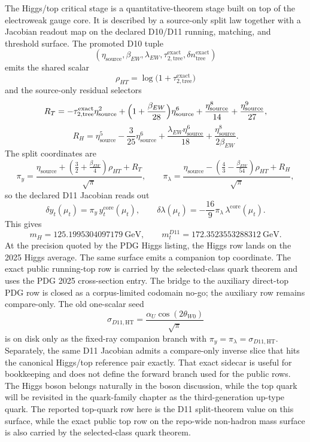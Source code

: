 \documentclass[11pt]{article}
\begin{document}
The Higgs/top critical stage is a quantitative-theorem stage built on top of the electroweak gauge core.
It is described by a source-only split law together with a Jacobian readout map on the declared D10/D11 running, matching, and threshold surface. The promoted D10 tuple
\[
(\eta_{\mathrm{source}},\beta_{EW},\lambda_{EW},\tau_{2,\mathrm{tree}}^{\mathrm{exact}},\delta n_{\mathrm{tree}}^{\mathrm{exact}})
\]
emits the shared scalar
\[
\rho_{HT}=\log\!\bigl(1+\tau_{2,\mathrm{tree}}^{\mathrm{exact}}\bigr)
\]
and the source-only residual selectors
\[
R_T=
-\tau_{2,\mathrm{tree}}^{\mathrm{exact}}\eta_{\mathrm{source}}^2
+\Bigl(1+\frac{\beta_{EW}}{28}\Bigr)\eta_{\mathrm{source}}^6
+\frac{\eta_{\mathrm{source}}^8}{14}
+\frac{\eta_{\mathrm{source}}^9}{27},
\]
\[
R_H=
\eta_{\mathrm{source}}^5
-\frac{3}{25}\eta_{\mathrm{source}}^6
+\frac{\lambda_{EW}\eta_{\mathrm{source}}^6}{18}
+\frac{\eta_{\mathrm{source}}^8}{2\beta_{EW}}.
\]
The split coordinates are
\[
\pi_y=
\frac{\eta_{\mathrm{source}}+\left(\frac32+\frac{\beta_{EW}}4\right)\rho_{HT}+R_T}{\sqrt{\pi}},
\qquad
\pi_\lambda=
\frac{\eta_{\mathrm{source}}-\left(\frac43-\frac{\beta_{EW}}{54}\right)\rho_{HT}+R_H}{\sqrt{\pi}},
\]
so the declared D11 Jacobian reads out
\[
\delta y_t(\mu_t)=\pi_y\,y_t^{\mathrm{core}}(\mu_t),
\qquad
\delta\lambda(\mu_t)=-\frac{16}{9}\pi_\lambda\,\lambda^{\mathrm{core}}(\mu_t).
\]
This gives
\[
m_H = 125.1995304097179~\mathrm{GeV},
\qquad
m_t^{D11} = 172.3523553288312~\mathrm{GeV}.
\]
At the precision quoted by the PDG Higgs listing, the Higgs row lands on the 2025 Higgs average. The
same surface emits a companion top coordinate. The exact public running-top row is carried by the
selected-class quark theorem and uses the PDG 2025 cross-section entry. The bridge to the auxiliary
direct-top PDG row is closed as a corpus-limited codomain no-go; the auxiliary row remains compare-only.
The old one-scalar seed
\[
\sigma_{D11,\mathrm{HT}}=\frac{\alpha_U\cos(2\theta_{W0})}{\sqrt{\pi}}
\]
is on disk only as the fixed-ray companion branch with \(\pi_y=\pi_\lambda=\sigma_{D11,\mathrm{HT}}\).
Separately, the same D11 Jacobian admits a compare-only inverse slice that hits the canonical
Higgs/top reference pair exactly. That exact sidecar is useful for bookkeeping and does not define
the forward branch used for the public rows.
The Higgs boson belongs naturally in the boson discussion, while the top quark will be revisited
in the quark-family chapter as the third-generation up-type quark. The reported top-quark row here is
the D11 split-theorem value on this surface, while the exact public top row on the repo-wide non-hadron mass surface is also carried by the selected-class quark theorem.
\end{document}
